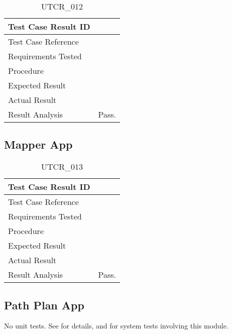 \documentclass[12pt, titlepage]{article}
\begin{document}
\begin{table}[!h]
\begin{center}
\caption {UTCR\_012}
\label{tab:UTCR_012}
\begin{tabular}{ | m{3.2cm} | m{12.2cm} | } 
\hline
Test Case Result ID & \nameref{tab:UTCR_012} \\ 
\hline
Test Case Reference & \nameref{tab:UTC_012}  \\ 
\hline
Requirements Tested & \\ 
\hline
Procedure &  \\ 
\hline
Expected Result &  \\ 
\hline
Actual Result &  \\ 
\hline
Result Analysis & Pass. \\ 
\hline
\end{tabular}
\end{center}
\end{table}

\clearpage

\subsection{Mapper App}
\label{subsec:mapperApp}

\begin{table}[!h]
\begin{center}
\caption {UTCR\_013}
\label{tab:UTCR_013}
\begin{tabular}{ | m{3.2cm} | m{12.2cm} | } 
\hline
Test Case Result ID & \nameref{tab:UTCR_013} \\ 
\hline
Test Case Reference & \nameref{tab:UTC_013}  \\ 
\hline
Requirements Tested & \\ 
\hline
Procedure &  \\ 
\hline
Expected Result &  \\ 
\hline
Actual Result &  \\ 
\hline
Result Analysis & Pass. \\ 
\hline
\end{tabular}
\end{center}
\end{table}

\clearpage

\subsection{Path Plan App}
\label{subsec:pathPlanApp}

No unit tests. See  for details, and  for system tests involving this module.
\end{document}
